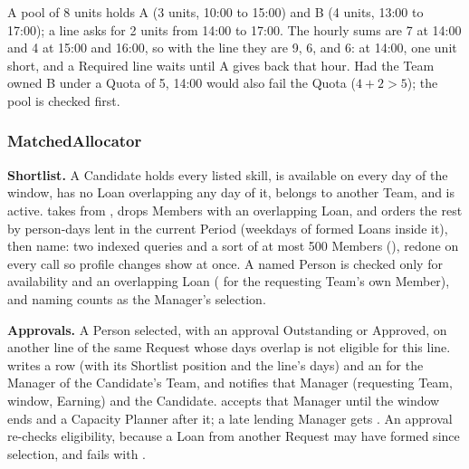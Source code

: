 A pool of 8 units holds A (3 units, 10:00 to 15:00) and B (4 units, 13:00 to 17:00); a line asks for 2 units from 14:00 to 17:00. The hourly sums are 7 at 14:00 and 4 at 15:00 and 16:00, so with the line they are 9, 6, and 6:  at 14:00, one unit short, and a Required line waits until A gives back that hour. Had the Team owned B under a Quota of 5, 14:00 would also fail the Quota ($4 + 2 > 5$); the pool is checked first.

\subsubsection*{MatchedAllocator}
\textbf{Shortlist.} A Candidate holds every listed skill, is available on every day of the window, has no Loan overlapping any day of it, belongs to another Team, and is active.  takes  from , drops Members with an overlapping Loan, and orders the rest by person-days lent in the current Period (weekdays of formed Loans inside it), then name: two indexed queries and a sort of at most 500 Members (), redone on every call so profile changes show at once. A named Person is checked only for availability and an overlapping Loan ( for the requesting Team's own Member), and naming counts as the Manager's selection.

\textbf{Approvals.} A Person selected, with an approval Outstanding or Approved, on another line of the same Request whose days overlap is not eligible for this line.  writes a  row (with its Shortlist position and the line's days) and an  for the Manager of the Candidate's Team, and notifies that Manager (requesting Team, window, Earning) and the Candidate.  accepts that Manager until the window ends and a Capacity Planner after it; a late lending Manager gets . An approval re-checks eligibility, because a Loan from another Request may have formed since selection, and fails with .

